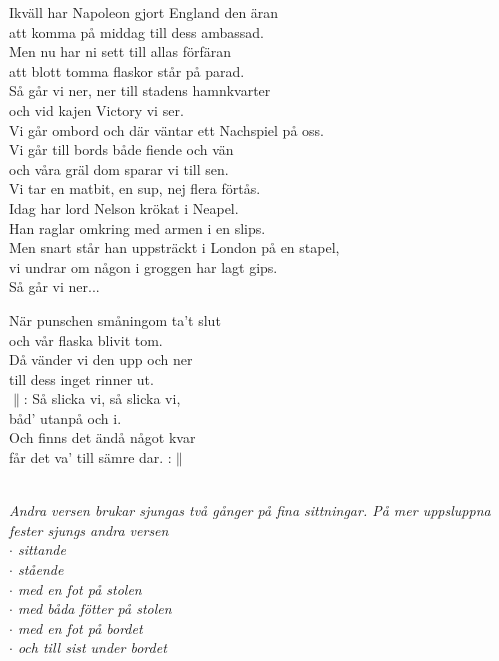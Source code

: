 \documentclass[a6paper, 10pt, twoside]{article}
\begin{document}
\noindent
\begin{center}
\end{center}
\begin{lyrics}
Ikväll har Napoleon gjort England den äran\\
att komma på middag till dess ambassad.\\
Men nu har ni sett till allas förfäran\\
att blott tomma flaskor står på parad.
\vspace{5pt}\\
Så går vi ner, ner till stadens hamnkvarter\\
och vid kajen Victory vi ser.\\
Vi går ombord och där väntar ett Nachspiel på oss.\\
Vi går till bords både fiende och vän\\
och våra gräl dom sparar vi till sen.\\
Vi tar en matbit, en sup, nej flera förtås.
\vspace{5pt}\\
Idag har lord Nelson krökat i Neapel.\\
Han raglar omkring med armen i en slips.\\
Men snart står han uppsträckt i London på en stapel,\\
vi undrar om någon i groggen har lagt gips.
\vspace{5pt}\\
Så går vi ner...
\end{lyrics}

\noindent
\begin{center}
\end{center}
\begin{lyrics}
När punschen småningom ta't slut\\
och vår flaska blivit tom.\\
Då vänder vi den upp och ner\\
till dess inget rinner ut.
\vspace{5pt}\\
$\|$: Så slicka vi, så slicka vi,\\
båd' utanpå och i.\\
Och finns det ändå något kvar\\
får det va' till sämre dar. :$\|$
\end{lyrics}
\vspace{10pt}\\ %
\textit{Andra versen brukar sjungas två gånger på fina sittningar. På mer uppsluppna fester sjungs andra versen\\
$\cdot$ sittande\\
$\cdot$ stående\\
$\cdot$ med en fot på stolen\\
$\cdot$ med båda fötter på stolen\\
$\cdot$ med en fot på bordet\\
$\cdot$ och till sist under bordet}
\end{document}
